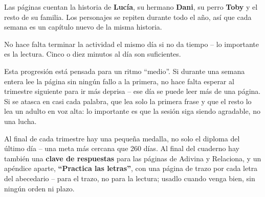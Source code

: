 Las páginas cuentan la historia de \textbf{Lucía}, su hermano
\textbf{Dani}, su perro \textbf{Toby} y el resto de su familia. Los
personajes se repiten durante todo el año, así que cada semana es un
capítulo nuevo de la misma historia.

No hace falta terminar la actividad el mismo día si no da tiempo -- lo
importante es la lectura. Cinco o diez minutos al día son suficientes.

Esta progresión está pensada para un ritmo ``medio''. Si durante una
semana entera lee la página sin ningún fallo a la primera, no hace
falta esperar al trimestre siguiente para ir más deprisa -- ese día se
puede leer más de una página. Si se atasca en casi cada palabra, que
lea solo la primera frase y que el resto lo lea un adulto en voz alta:
lo importante es que la sesión siga siendo agradable, no una lucha.

Al final de cada trimestre hay una pequeña medalla, no solo el diploma
del último día -- una meta más cercana que 260 días. Al final del
cuaderno hay también una \textbf{clave de respuestas} para las páginas
de Adivina y Relaciona, y un apéndice aparte, \textbf{``Practica las
letras''}, con una página de trazo por cada letra del abecedario --
para el trazo, no para la lectura; usadlo cuando venga bien, sin
ningún orden ni plazo.
\newpage
